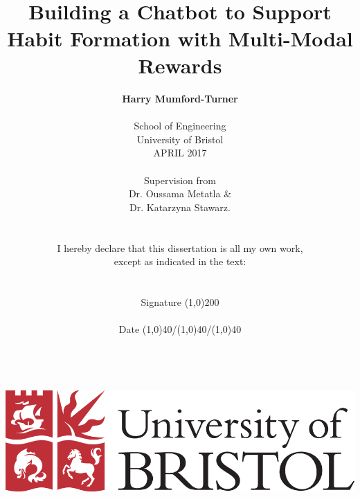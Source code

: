 
\date{} %
\title{\huge{\textbf{\\\\\\Building a Chatbot to Support Habit Formation with Multi-Modal Rewards}}}
\author{\textbf{Harry Mumford-Turner}\\
\\
School of Engineering\\
University of Bristol\\
APRIL 2017\\
\\
Supervision from\\
Dr. Oussama Metatla \&\\Dr. Katarzyna Stawarz.
\\
\\\\
I hereby declare that this dissertation is all my own work,\\
except as indicated in the text:\\
\\
\\
Signature \line(1,0){200}\\
\\
Date \line(1,0){40}/\line(1,0){40}/\line(1,0){40}\\
\\
\\
\\
\\
\includegraphics[scale=0.29]{resources/UoB-logo.png}}
